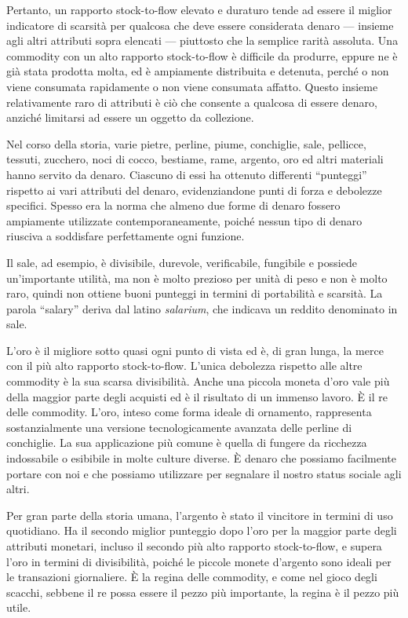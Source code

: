 \documentclass[
  a5paper,
  smalldemyvopaper,10pt,twoside,onecolumn,openright,extrafontsizes,hidelinks]{memoir}
\begin{document}
Pertanto, un rapporto stock-to-flow elevato e duraturo tende ad essere
il miglior indicatore di scarsità per qualcosa che deve essere
considerata denaro --- insieme agli altri attributi sopra elencati ---
piuttosto che la semplice rarità assoluta. Una commodity con un alto
rapporto stock-to-flow è difficile da produrre, eppure ne è già stata
prodotta molta, ed è ampiamente distribuita e detenuta, perché o non
viene consumata rapidamente o non viene consumata affatto. Questo
insieme relativamente raro di attributi è ciò che consente a qualcosa di
essere denaro, anziché limitarsi ad essere un oggetto da collezione.

Nel corso della storia, varie pietre, perline, piume, conchiglie, sale,
pellicce, tessuti, zucchero, noci di cocco, bestiame, rame, argento, oro
ed altri materiali hanno servito da denaro. Ciascuno di essi ha ottenuto
differenti ``punteggi'' rispetto ai vari attributi del denaro,
evidenziandone punti di forza e debolezze specifici. Spesso era la norma
che almeno due forme di denaro fossero ampiamente utilizzate
contemporaneamente, poiché nessun tipo di denaro riusciva a soddisfare
perfettamente ogni funzione.

Il sale, ad esempio, è divisibile, durevole, verificabile, fungibile e
possiede un'importante utilità, ma non è molto prezioso per unità di
peso e non è molto raro, quindi non ottiene buoni punteggi in termini di
portabilità e scarsità. La parola ``salary'' deriva dal latino
\emph{salarium}, che indicava un reddito denominato in sale.

L'oro è il migliore sotto quasi ogni punto di vista ed è, di gran lunga,
la merce con il più alto rapporto stock-to-flow. L'unica debolezza
rispetto alle altre commodity è la sua scarsa divisibilità. Anche una
piccola moneta d'oro vale più della maggior parte degli acquisti ed è il
risultato di un immenso lavoro. È il re delle commodity. L'oro, inteso
come forma ideale di ornamento, rappresenta sostanzialmente una versione
tecnologicamente avanzata delle perline di conchiglie. La sua
applicazione più comune è quella di fungere da ricchezza indossabile o
esibibile in molte culture diverse. È denaro che possiamo facilmente
portare con noi e che possiamo utilizzare per segnalare il nostro status
sociale agli altri.

Per gran parte della storia umana, l'argento è stato il vincitore in
termini di uso quotidiano. Ha il secondo miglior punteggio dopo l'oro
per la maggior parte degli attributi monetari, incluso il secondo più
alto rapporto stock-to-flow, e supera l'oro in termini di divisibilità,
poiché le piccole monete d'argento sono ideali per le transazioni
giornaliere. È la regina delle commodity, e come nel gioco degli
scacchi, sebbene il re possa essere il pezzo più importante, la regina è
il pezzo più utile.
\end{document}
